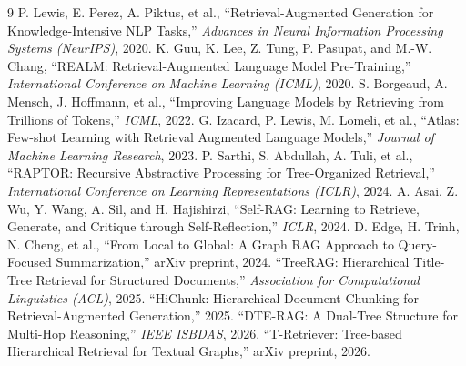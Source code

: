\documentclass[12pt, a4paper, openright, twoside]{report}
\begin{document}
\newpage
\begin{thebibliography}{9}
 P. Lewis, E. Perez, A. Piktus, et al., ``Retrieval-Augmented Generation for Knowledge-Intensive NLP Tasks,'' \emph{Advances in Neural Information Processing Systems (NeurIPS)}, 2020.
 K. Guu, K. Lee, Z. Tung, P. Pasupat, and M.-W. Chang, ``REALM: Retrieval-Augmented Language Model Pre-Training,'' \emph{International Conference on Machine Learning (ICML)}, 2020.
 S. Borgeaud, A. Mensch, J. Hoffmann, et al., ``Improving Language Models by Retrieving from Trillions of Tokens,'' \emph{ICML}, 2022.
 G. Izacard, P. Lewis, M. Lomeli, et al., ``Atlas: Few-shot Learning with Retrieval Augmented Language Models,'' \emph{Journal of Machine Learning Research}, 2023.
 P. Sarthi, S. Abdullah, A. Tuli, et al., ``RAPTOR: Recursive Abstractive Processing for Tree-Organized Retrieval,'' \emph{International Conference on Learning Representations (ICLR)}, 2024.
 A. Asai, Z. Wu, Y. Wang, A. Sil, and H. Hajishirzi, ``Self-RAG: Learning to Retrieve, Generate, and Critique through Self-Reflection,'' \emph{ICLR}, 2024.
 D. Edge, H. Trinh, N. Cheng, et al., ``From Local to Global: A Graph RAG Approach to Query-Focused Summarization,'' arXiv preprint, 2024.
 ``TreeRAG: Hierarchical Title-Tree Retrieval for Structured Documents,'' \emph{Association for Computational Linguistics (ACL)}, 2025.
 ``HiChunk: Hierarchical Document Chunking for Retrieval-Augmented Generation,'' 2025.
 ``DTE-RAG: A Dual-Tree Structure for Multi-Hop Reasoning,'' \emph{IEEE ISBDAS}, 2026.
 ``T-Retriever: Tree-based Hierarchical Retrieval for Textual Graphs,'' arXiv preprint, 2026.
\end{thebibliography}
\end{document}
